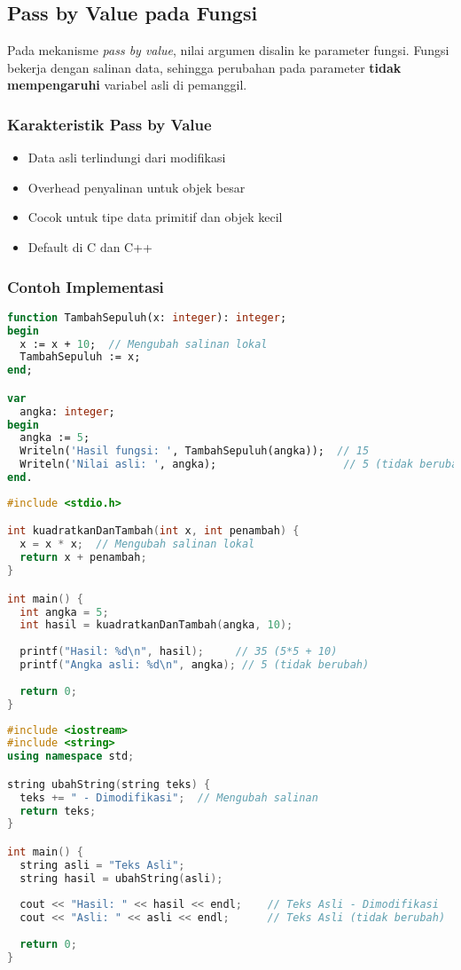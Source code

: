 \documentclass[../main.tex]{subfiles}
\begin{document}
\subsection{Pass by Value pada Fungsi}
Pada mekanisme \emph{pass by value}, nilai argumen disalin ke parameter fungsi. Fungsi bekerja dengan salinan data, sehingga perubahan pada parameter \textbf{tidak mempengaruhi} variabel asli di pemanggil.

\subsubsection{Karakteristik Pass by Value}
\begin{itemize}
  \item Data asli terlindungi dari modifikasi
  \item Overhead penyalinan untuk objek besar
  \item Cocok untuk tipe data primitif dan objek kecil
  \item Default di C dan C++
\end{itemize}

\subsubsection{Contoh Implementasi}
\begin{lstlisting}[language=Pascal, caption={Pass by value (Pascal)}]
function TambahSepuluh(x: integer): integer;
begin
  x := x + 10;  // Mengubah salinan lokal
  TambahSepuluh := x;
end;

var
  angka: integer;
begin
  angka := 5;
  Writeln('Hasil fungsi: ', TambahSepuluh(angka));  // 15
  Writeln('Nilai asli: ', angka);                    // 5 (tidak berubah)
end.
\end{lstlisting}

\begin{lstlisting}[language=C, caption={Pass by value (C)}]
#include <stdio.h>

int kuadratkanDanTambah(int x, int penambah) {
  x = x * x;  // Mengubah salinan lokal
  return x + penambah;
}

int main() {
  int angka = 5;
  int hasil = kuadratkanDanTambah(angka, 10);
  
  printf("Hasil: %d\n", hasil);     // 35 (5*5 + 10)
  printf("Angka asli: %d\n", angka); // 5 (tidak berubah)
  
  return 0;
}
\end{lstlisting}

\begin{lstlisting}[language=C++, caption={Pass by value dengan objek (C++)}]
#include <iostream>
#include <string>
using namespace std;

string ubahString(string teks) {
  teks += " - Dimodifikasi";  // Mengubah salinan
  return teks;
}

int main() {
  string asli = "Teks Asli";
  string hasil = ubahString(asli);
  
  cout << "Hasil: " << hasil << endl;    // Teks Asli - Dimodifikasi
  cout << "Asli: " << asli << endl;      // Teks Asli (tidak berubah)
  
  return 0;
}
\end{lstlisting}
\end{document}
